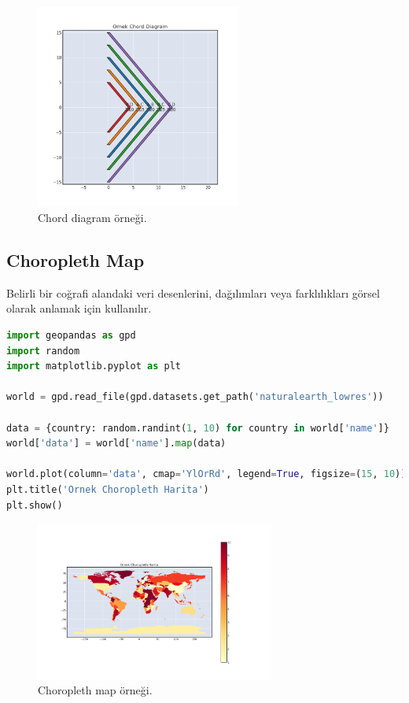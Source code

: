 \begin{figure}[h]
    \centering
    \includegraphics[width=0.6\textwidth]{images/chord_diagram.png}
    \caption{Chord diagram örneği.}
    \label{fig:enter-label}
\end{figure}

\newpage

\subsection{Choropleth Map}
Belirli bir coğrafi alandaki veri desenlerini, dağılımları veya farklılıkları görsel olarak anlamak için kullanılır.

\begin{lstlisting}[language=Python]
import geopandas as gpd
import random
import matplotlib.pyplot as plt

world = gpd.read_file(gpd.datasets.get_path('naturalearth_lowres'))

data = {country: random.randint(1, 10) for country in world['name']}
world['data'] = world['name'].map(data)

world.plot(column='data', cmap='YlOrRd', legend=True, figsize=(15, 10))
plt.title('Ornek Choropleth Harita')
plt.show() 
\end{lstlisting}

\begin{figure}[h]
    \centering
    \includegraphics[width=0.7\textwidth]{images/choropleth_map.png}
    \caption{Choropleth map örneği.}
    \label{fig:enter-label}
\end{figure}

